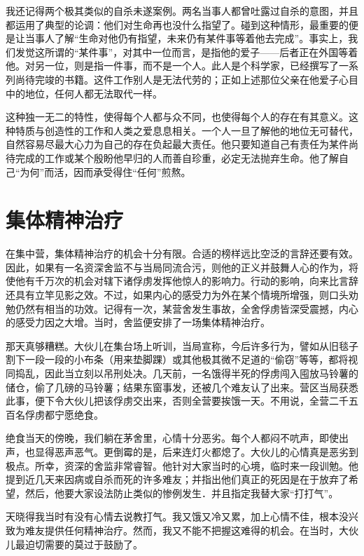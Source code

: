 \documentclass[11pt,oneside]{book}
\begin{document}
\begin{common-format}
我还记得两个极其类似的自杀未遂案例。两名当事人都曾吐露过自杀的意图，并且都运用了典型的论调：他们对生命再也没什么指望了。碰到这种情形，最重要的便是让当事人了解“生命对他仍有指望，未来仍有某件事等着他去完成”。事实上，我们发觉这所谓的“某件事”，对其中一位而言，是指他的爱子——后者正在外国等着他。对另一位，则是指一件事，而不是一个人。此人是个科学家，已经撰写了一系列尚待完竣的书籍。这件工作别人是无法代劳的；正如上述那位父亲在他爱子心目中的地位，任何人都无法取代一样。

这种独一无二的特性，使得每个人都与众不同，也使得每个人的存在有其意义。这种特质与创造性的工作和人类之爱息息相关。一个人一旦了解他的地位无可替代，自然容易尽最大心力为自己的存在负起最大责任。他只要知道自己有责任为某件尚待完成的工作或某个殷盼他早归的人而善自珍重，必定无法抛弃生命。他了解自己“为何”而活，因而承受得住“任何”煎熬。


\section{集体精神治疗}
在集中营，集体精神治疗的机会十分有限。合适的榜样远比空泛的言辞还要有效。因此，如果有一名资深舍监不与当局同流合污，则他的正义并鼓舞人心的作为，将使他有千万次的机会对辖下诸俘虏发挥他惊人的影响力。行动的影响，向来比言辞还具有立竿见影之效。不过，如果内心的感受力为外在某个情境所增强，则口头劝勉仍然有相当的功效。记得有一次，某营舍发生事故，全舍俘虏皆深受震撼，内心的感受力因之大增。当时，舍监便安排了一场集体精神治疗。

那天真够糟糕。大伙儿在集台场上听训，当局宣称，今后许多行为，譬如从旧毯子割下一段一段的小布条（用来垫脚踝）或其他极其微不足道的“偷窃”等等，都将视同捣乱，因此当立刻以吊刑处决。几天前，一名饿得半死的俘虏闯入囤放马铃薯的储仓，偷了几磅的马铃薯；结果东窗事发，还被几个难友认了出来。营区当局获悉此事，便下令大伙儿把该俘虏交出来，否则全营要挨饿一天。不用说，全营二千五百名俘虏都宁愿绝食。

绝食当天的傍晚，我们躺在茅舍里，心情十分恶劣。每个人都闷不吭声，即使出声，也显得恶声恶气。更倒霉的是，后来连灯火都熄了。大伙儿的心情真是恶劣到极点。所幸，资深的舍监非常睿智。他针对大家当时的心境，临时来一段训勉。他提到近几天来因病或自杀而死的许多难友；并指出他们真正的死因是在于放弃了希望，然后，他要大家设法防止类似的惨例发生．并且指定我替大家“打打气”。

天晓得我当时有没有心情去说教打气。我又饿又冷又累，加上心情不佳，根本没兴致为难友提供任何精神治疗。然而，我又不能不把握这难得的机会。在当时，大伙儿最迫切需要的莫过于鼓励了。


\end{common-format}
\end{document}

